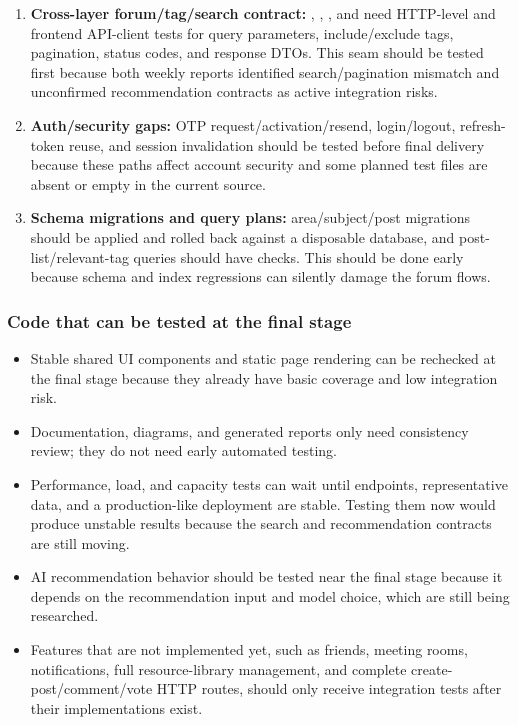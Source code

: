 \documentclass[12pt]{article}
\begin{document}
\begin{enumerate}

\item \textbf{Cross-layer forum/tag/search contract:} \texttt{}, \texttt{}, \texttt{}, and \texttt{} need HTTP-level and frontend API-client tests for query parameters, include/exclude tags, pagination, status codes, and response DTOs. This seam should be tested first because both weekly reports identified search/pagination mismatch and unconfirmed recommendation contracts as active integration risks.

\item \textbf{Auth/security gaps:} OTP request/activation/resend, login/logout, refresh-token reuse, and session invalidation should be tested before final delivery because these paths affect account security and some planned test files are absent or empty in the current source.

\item \textbf{Schema migrations and query plans:} area/subject/post migrations should be applied and rolled back against a disposable database, and post-list/relevant-tag queries should have \texttt{} checks. This should be done early because schema and index regressions can silently damage the forum flows.

\end{enumerate}

\subsubsection{Code that can be tested at the final stage}

\begin{itemize}

\item Stable shared UI components and static page rendering can be rechecked at the final stage because they already have basic coverage and low integration risk.

\item Documentation, diagrams, and generated reports only need consistency review; they do not need early automated testing.

\item Performance, load, and capacity tests can wait until endpoints, representative data, and a production-like deployment are stable. Testing them now would produce unstable results because the search and recommendation contracts are still moving.

\item AI recommendation behavior should be tested near the final stage because it depends on the recommendation input and model choice, which are still being researched.

\item Features that are not implemented yet, such as friends, meeting rooms, notifications, full resource-library management, and complete create-post/comment/vote HTTP routes, should only receive integration tests after their implementations exist.

\end{itemize}
\end{document}
